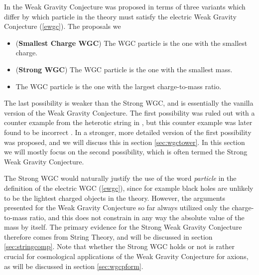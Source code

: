 \documentclass[11pt,a4paper]{article}
\numberwithin{equation}{section}
\numberwithin{table}{section}\setlength{\multlinegap}{25pt}
\begin{document}
In \cite{ArkaniHamed:2006dz} the Weak Gravity Conjecture was proposed in terms of three variants which differ by which particle in the theory must satisfy the electric Weak Gravity Conjecture (\ref{ewgc}). The proposals we
\begin{itemize}
\item ({\bf Smallest Charge WGC}) The WGC particle is the one with the smallest charge.
\item ({\bf Strong WGC}) The WGC particle is the one with the smallest mass.
\item The WGC particle is the one with the largest charge-to-mass ratio.
\end{itemize}
The last possibility is weaker than the Strong WGC, and is essentially the vanilla version of the Weak Gravity Conjecture. The first possibility was ruled out with a counter example from the heterotic string in \cite{ArkaniHamed:2006dz}, but this counter example was later found to be incorrect \cite{Heidenreich:2015nta}. In \cite{Heidenreich:2015nta,Heidenreich:2016aqi} a stronger, more detailed version of the first possibility was proposed, and we will discuss this in section \ref{sec:wgctower}.  In this section we will mostly focus on the second possibility, which is often termed the Strong Weak Gravity Conjecture.

The Strong WGC would naturally justify the use of the word {\it particle} in the definition of the electric WGC (\ref{ewgc}), since for example black holes are unlikely to be the lightest charged objects in the theory. However, the arguments presented for the Weak Gravity Conjecture so far always utilized only the charge-to-mass ratio, and this does not constrain in any way the absolute value of the mass by itself. The primary evidence for the Strong Weak Gravity Conjecture therefore comes from String Theory, and will be discussed in section \ref{sec:stringcomp}. Note that whether the Strong WGC holds or not is rather crucial for cosmological applications of the Weak Gravity Conjecture for axions, as will be discussed in section \ref{sec:wgcpform}. 
\end{document}
